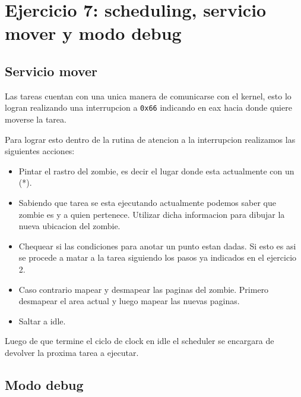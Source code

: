 \section{Ejercicio 7: scheduling, servicio mover y modo debug}


\subsection{Servicio mover}
	Las tareas cuentan con una unica manera de comunicarse con el kernel, esto lo logran realizando una interrupcion a \texttt{0x66} indicando  en eax hacia donde quiere moverse la tarea.

	Para lograr esto dentro de la rutina de atencion a la interrupcion realizamos las siguientes acciones:

	\begin{itemize}
		\item{Pintar el rastro del zombie, es decir el lugar donde esta actualmente con un (*).}
		\item{Sabiendo que tarea se esta ejecutando actualmente podemos saber que zombie es y a quien pertenece. Utilizar dicha informacion para dibujar la nueva ubicacion del zombie.}
		\item{Chequear si las condiciones para anotar un punto estan dadas. Si esto es asi se procede a matar a la tarea siguiendo los pasos ya indicados en el ejercicio 2.}
		\item{Caso contrario mapear y desmapear las paginas del zombie. Primero desmapear el area actual y luego mapear las nuevas paginas.}
		\item{Saltar a idle.}
	\end{itemize}

	Luego de que termine el ciclo de clock en idle el scheduler se encargara de devolver la proxima tarea a ejecutar.

\subsection{Modo debug}	